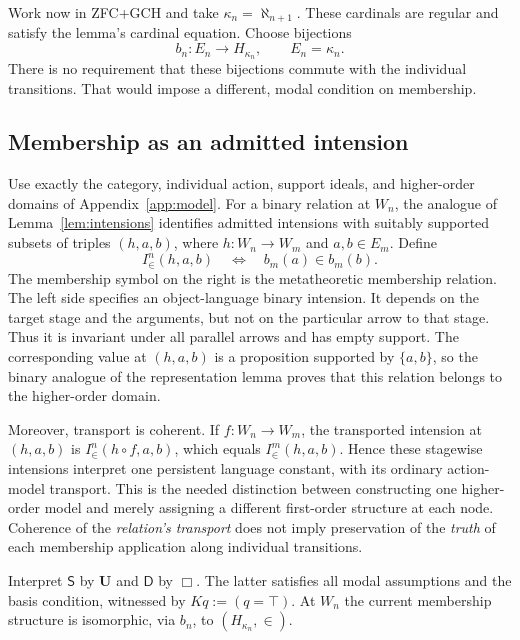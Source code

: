 \documentclass[11pt]{article}
\theoremstyle{definition}
\newcommand{\D}{\mathsf D}
\newcommand{\U}{\mathbf U}
\numberwithin{equation}{section}
\begin{document}
Work now in ZFC+GCH and take $\kappa_n=\aleph_{n+1}$. These cardinals are regular and satisfy the lemma's cardinal equation. Choose bijections
$$
b_n:E_n\longrightarrow H_{\kappa_n},\qquad E_n=\kappa_n.
$$
There is no requirement that these bijections commute with the individual transitions. That would impose a different, modal condition on membership.

\subsection{Membership as an admitted intension}

Use exactly the category, individual action, support ideals, and higher-order domains of Appendix~\ref{app:model}. For a binary relation at $W_n$, the analogue of Lemma~\ref{lem:intensions} identifies admitted intensions with suitably supported subsets of triples $(h,a,b)$, where $h:W_n\to W_m$ and $a,b\in E_m$. Define
\begin{equation}\label{eq:membership-intension}
I^n_{\in}(h,a,b)
\quad\Longleftrightarrow\quad b_m(a)\in b_m(b).
\end{equation}
The membership symbol on the right is the metatheoretic membership relation. The left side specifies an object-language binary intension. It depends on the target stage and the arguments, but not on the particular arrow to that stage. Thus it is invariant under all parallel arrows and has empty support. The corresponding value at $(h,a,b)$ is a proposition supported by $\{a,b\}$, so the binary analogue of the representation lemma proves that this relation belongs to the higher-order domain.

Moreover, transport is coherent. If $f:W_n\to W_m$, the transported intension at $(h,a,b)$ is $I^n_{\in}(h\circ f,a,b)$, which equals $I^m_{\in}(h,a,b)$. Hence these stagewise intensions interpret one persistent language constant, with its ordinary action-model transport. This is the needed distinction between constructing one higher-order model and merely assigning a different first-order structure at each node. Coherence of the \emph{relation's transport} does not imply preservation of the \emph{truth} of each membership application along individual transitions.

Interpret $\mathsf S$ by $\U$ and $\D $ by $\Box$. The latter satisfies all modal assumptions and the basis condition, witnessed by $Kq:=(q=\top)$. At $W_n$ the current membership structure is isomorphic, via $b_n$, to $(H_{\kappa_n},\in)$.
\end{document}
